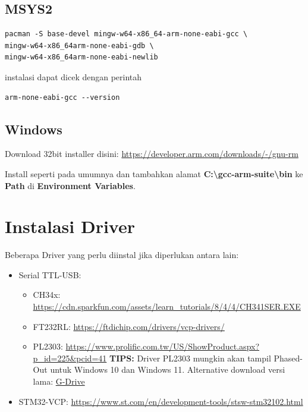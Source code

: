 \documentclass[12pt]{book}
\begin{document}
	\subsection{MSYS2}
	
	\begin{verbatim}
pacman -S base-devel mingw-w64-x86_64-arm-none-eabi-gcc \
mingw-w64-x86_64arm-none-eabi-gdb \
mingw-w64-x86_64arm-none-eabi-newlib
	\end{verbatim}
	
	instalasi dapat dicek dengan perintah
	\begin{verbatim}
arm-none-eabi-gcc --version
	\end{verbatim}
	
	\subsection{Windows}
	
	Download 32bit installer disini: \url{https://developer.arm.com/downloads/-/gnu-rm}
	
	Install seperti pada umumnya dan tambahkan alamat \textbf{C:\textbackslash gcc-arm-suite\textbackslash bin} ke \textbf{Path} di \textbf{Environment Variables}.
	
	\section{Instalasi Driver}
	
	Beberapa Driver yang perlu diinstal jika diperlukan antara lain:
	
	\begin{itemize}
		\item Serial TTL-USB:
		\begin{itemize}
			\item CH34x: \url{https://cdn.sparkfun.com/assets/learn_tutorials/8/4/4/CH341SER.EXE}
			\item FT232RL: \url{https://ftdichip.com/drivers/vcp-drivers/}
			\item PL2303: \url{https://www.prolific.com.tw/US/ShowProduct.aspx?p_id=225&pcid=41}
			\textbf{TIPS:} Driver PL2303 mungkin akan tampil Phased-Out untuk Windows 10 dan Windows 11.
			Alternative download versi lama: \href{https://drive.google.com/file/d/11ivvhc-s3gQD2uzF0HDYm6e5w_w103FT/view}{G-Drive}
		\end{itemize}
		
		\item STM32-VCP: \url{https://www.st.com/en/development-tools/stsw-stm32102.html}
	\end{itemize}
	
\end{document}

